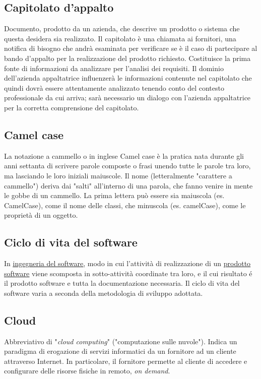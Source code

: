 	\subsection{Capitolato d'appalto}
	\label{sec:capitolato}
	Documento, prodotto da un azienda, che descrive un prodotto o sistema che questa desidera sia realizzato. Il capitolato è una chiamata ai fornitori, una notifica di bisogno che andrà esaminata per verificare se è il caso di partecipare al bando d'appalto per la realizzazione del prodotto richiesto. Costituisce la prima fonte di informazioni da analizzare per l'analisi dei requisiti. Il dominio dell'azienda appaltatrice influenzerà le informazioni contenute nel capitolato che quindi dovrà essere attentamente analizzato tenendo conto del contesto professionale da cui arriva; sarà necessario un dialogo con l'azienda appaltatrice per la corretta comprensione del capitolato.

	\subsection{Camel case}
	\label{sec:camelCase}
	La notazione a cammello o in inglese Camel case è la pratica nata durante gli anni settanta di scrivere parole composte o frasi unendo tutte le parole tra loro, ma lasciando le loro iniziali maiuscole. Il nome (letteralmente "carattere a cammello") deriva dai "salti" all'interno di una parola, che fanno venire in mente le gobbe di un cammello. La prima lettera può essere sia maiuscola (es. CamelCase), come il nome delle classi, che minuscola (es. camelCase), come le proprietà di un oggetto.



	\subsection{Ciclo di vita del software}
	\label{sec:ciclodivita}
	In \underline{\hyperref[sec:swe]{ingegneria del software}}, modo in cui l'attività di realizzazione di un \underline{\hyperref[sec:prodottosoftware]{prodotto software}} viene scomposta in sotto-attività coordinate tra loro, e il cui risultato é il prodotto software e tutta la documentazione necessaria. Il ciclo di vita del software varia a seconda della metodologia di sviluppo adottata.



	\subsection{Cloud}
	\label{sec:cloud}
	Abbreviativo di "\emph{cloud computing}" ("computazione sulle nuvole"). Indica un paradigma di erogazione di servizi informatici da un fornitore ad un cliente attraverso Internet. In particolare, il fornitore permette al cliente di accedere e configurare delle risorse fisiche in remoto, \emph{on demand}.


